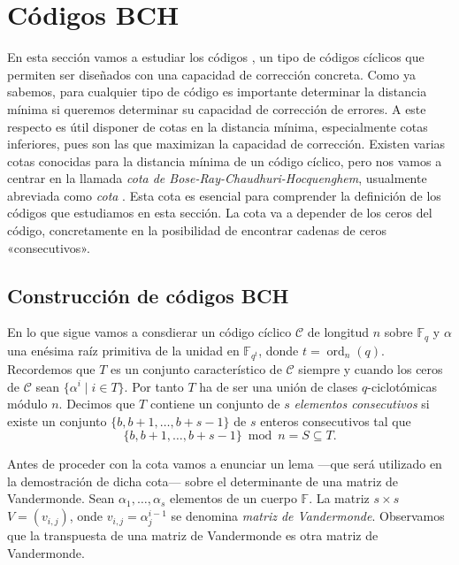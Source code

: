 

\chapter{Códigos BCH}


En esta sección vamos a estudiar los códigos , un tipo de códigos cíclicos que permiten ser diseñados con una capacidad de corrección concreta.
Como ya sabemos, para cualquier tipo de código es importante determinar la distancia mínima si queremos determinar su capacidad de corrección de errores.
A este respecto es útil disponer de cotas en la distancia mínima, especialmente cotas inferiores, pues son las que maximizan la capacidad de corrección.
Existen varias cotas conocidas para la distancia mínima de un código cíclico, pero nos vamos a centrar en la llamada \textit{cota de Bose-Ray-Chaudhuri-Hocquenghem}, usualmente abreviada como \textit{cota }.
Esta cota es esencial para comprender la definición de los códigos  que estudiamos en esta sección.
La cota  va a depender de los ceros del código, concretamente en la posibilidad de encontrar cadenas de ceros «consecutivos».

\section{Construcción de códigos BCH}

En lo que sigue vamos a consdierar un código cíclico \(\mathcal C\)  de longitud \(n\) sobre \(\mathbb F_q\) y \(\alpha\) una enésima raíz primitiva de la unidad en \(\mathbb F_{q^t}\), donde \(t = \operatorname{ord}_n(q)\).
Recordemos que \(T\) es un conjunto característico de \(\mathcal C\) siempre y cuando los ceros de \(\mathcal C\) sean \(\{\alpha^{i} \mid i \in T\}\).
Por tanto \(T\) ha de ser una unión de clases \(q\)-ciclotómicas módulo \(n\).
Decimos que \(T\) contiene un conjunto de \(s\) \textit{elementos consecutivos} si existe un conjunto \(\{b, b + 1, \dots, b + s - 1\}\) de \(s\) enteros consecutivos tal que
\[
  \{b, b + 1, \dots, b + s - 1\} \bmod n = S \subseteq T.
\]

Antes de proceder con la cota  vamos a enunciar un lema —que será utilizado en la demostración de dicha cota— sobre el determinante de una matriz de Vandermonde.
Sean \(\alpha_1, \dots, \alpha_s\) elementos de un cuerpo \(\mathbb F\).
La matriz \(s \times s\) \(V = (v_{i, j})\), onde \(v_{i,j} = \alpha_{j}^{i-1}\) se denomina \textit{matriz de Vandermonde}.
Observamos que la transpuesta de una matriz de Vandermonde es otra matriz de Vandermonde.

